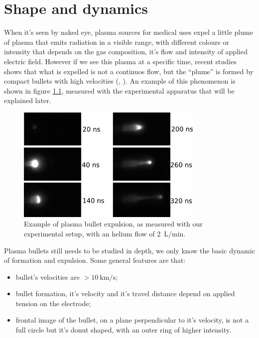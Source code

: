 \chapter{Shape and dynamics}
\label{ch:forma}
When it's seen by naked eye, plasma sources for medical uses expel a little plume of plasma that emits radiation in a visible range, with different colours or intensity that depends on the gas composition, it's flow and intensity of applied electric field. 
However if we see this plasma at a specific time, recent studies shows that what is expelled is not a continuos flow, but the ``plume'' is formed by compact bullets with high velocities (\cite{Mericam_Bourdet_2009}, \cite{doi:10.1002/ppap.200900078}).
An example of this phenomenon is shown in figure \ref{fig:pl_bullet}, measured with the experimental apparatus that will be explained later.
\begin{figure}
 \centering
 \includegraphics[width=0.8\textwidth]{Images/Shape/frames.png}
 \caption{Example of plasma bullet expulsion, as measured with our experimental setup, with an helium flow of \SI{2}{\liter/\minute}.}
 \label{fig:pl_bullet}
\end{figure}

Plasma bullets still needs to be studied in depth, we only know the basic dynamic of formation and expulsion. Some general features are that:
\begin{itemize}
 \item bullet's velocities are $> \SI{10}{\kilo\meter/\second}$;
 \item bullet formation, it's velocity and it's travel distance depend on applied tension on the electrode;
 \item frontal image of the bullet, on a plane perpendicular to it's velocity, is not a full circle but it's donut shaped, with an outer ring of higher intensity.
\end{itemize}


